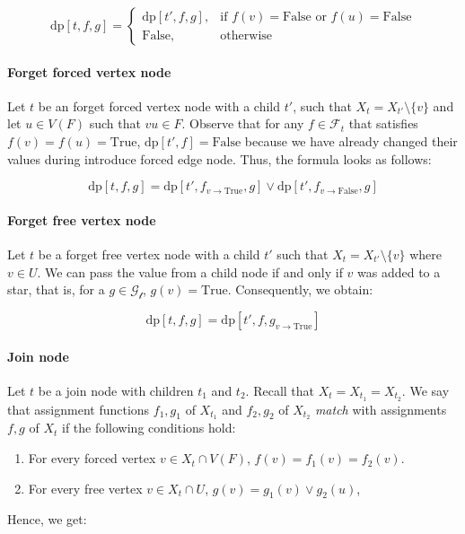 \documentclass[en]{pracamgr}
\theoremstyle{definition}
\newcommand{\dpt}[1]{\textrm{dp}[#1]}
\newcommand{\true}{\textrm{True}}
\newcommand{\false}{\textrm{False}}
\begin{document}
\begin{equation*}
	\dpt{t,f,g} =
	\begin{cases}
		\dpt{t',f,g}, & \text{if $f(v)=\false$ or $f(u)=\false$} \\
		\false, & \text{otherwise}
	\end{cases}
\end{equation*}

\paragraph{Forget forced vertex node} Let $t$ be an forget forced vertex node with a child $t'$, such that $X_t = X_{t'} \setminus \{v\}$ and let $u \in V(F)$ such that $vu \in F$. Observe that for any $f \in \mathcal{F}_t$ that satisfies $f(v)=f(u)=\true$, $\dpt{t',f} = \false$ because we have already changed their values during introduce forced edge node. Thus, the formula looks as follows:

\begin{equation*}
	\dpt{t,f,g} = \dpt{t',f_{v \rightarrow \true},g} \lor \dpt{t',f_{v \rightarrow \false},g}
\end{equation*}

\paragraph{Forget free vertex node} Let $t$ be a forget free vertex node with a child $t'$ such that $X_t = X_{t'} \setminus \{v\}$ where $v \in U$. We can pass the value from a child node if and only if $v$ was added to a star, that is, for a $g \in \mathcal{G_t}$, $g(v)=\true$. Consequently, we obtain:

\begin{equation*}
	\dpt{t,f,g} = \dpt{t',f,g_{v \rightarrow \true}}
\end{equation*}

\paragraph{Join node} Let $t$ be a join node with children $t_1$ and $t_2$. Recall that $X_t=X_{t_1}=X_{t_2}$. We say that assignment functions $f_1,g_1$ of $X_{t_1}$ and $f_2,g_2$ of $X_{t_2}$ \textit{match} with assignments $f,g$ of $X_t$ if the following conditions hold:

\begin{enumerate}
	\item For every forced vertex $v \in X_t \cap V(F)$, $f(v)=f_1(v)=f_2(v)$.
	\item For every free vertex $v \in X_t \cap U$, $g(v)=g_1(v) \lor g_2(u)$, 
\end{enumerate}
Hence, we get:
\end{document}
